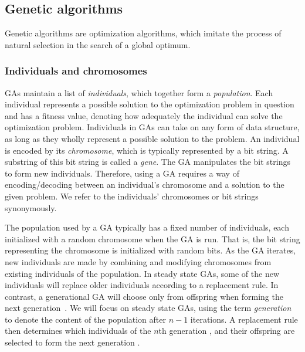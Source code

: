 \subsection{Genetic algorithms} 
Genetic algorithms are optimization algorithms, which imitate the process of natural selection in the search of a global optimum.

\subsubsection{Individuals and chromosomes}
GAs maintain a list of \emph{individuals}, which together form a \emph{population}. Each individual represents a possible solution to the optimization problem in question and has a fitness value, denoting how adequately the individual can solve the optimization problem. Individuals in GAs can take on any form of data structure, as long as they wholly represent a possible solution to the problem. An individual is encoded by its \emph{chromosome}, which is typically represented by a bit string. A substring of this bit string is called a \emph{gene}. The GA manipulates the bit strings to form new individuals. Therefore, using a GA requires a way of encoding/decoding between an individual's chromosome and a solution to the given problem. We refer to the individuals' chromosomes or bit strings synonymously.

The population used by a GA typically has a fixed number of individuals, each initialized with a random chromosome when the GA is run. That is, the bit string representing the chromosome is initialized with random bits. As the GA iterates, new individuals are made by combining and modifying chromosomes from existing individuals of the population. In steady state GAs, some of the new individuals will replace older individuals according to a replacement rule. In contrast, a generational GA will choose only from offspring when forming the next generation~\cite{fogarty, Syswerda:1989:UCG:645512.657265, Whitley:1989:GAS:93126.93169}. We will focus on steady state GAs, using the term \emph{generation}  to denote the content of the population after $n - 1$ iterations. A replacement rule then determines which individuals of the $n$th generation , and their offspring  are selected to form the next generation .



